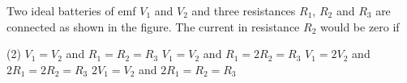 
\item Two ideal batteries of emf \(V_1\) and \(V_2\) and three resistances \(R_1\), \(R_2\) and \(R_3\) are connected as shown in the figure. The current in resistance \(R_2\) would be zero if
    \begin{center}
    \end{center}
    \begin{tasks}(2)
        \task \(V_1 = V_2\) and \(R_1 = R_2 = R_3\)
        \task \(V_1 = V_2\) and \(R_1 = 2R_2 = R_3\)
        \task \(V_1 = 2V_2\) and \(2R_1 = 2R_2 = R_3\)
        \task \(2V_1 = V_2\) and \(2R_1 = R_2 = R_3\)
    \end{tasks}
